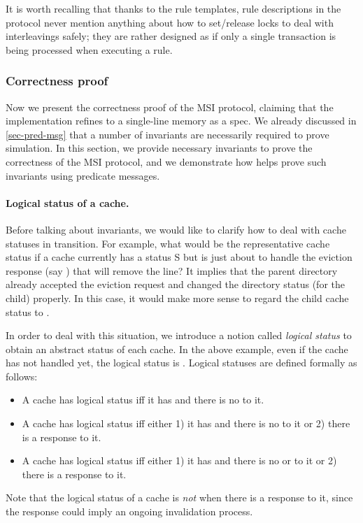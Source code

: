 \documentclass[sigplan,10pt,review,anonymous,screen]{acmart}\settopmatter{printfolios=true,printccs=false,printacmref=false}
\begin{document}
It is worth recalling that thanks to the rule templates, rule descriptions in the protocol never mention anything about how to set/release locks to deal with interleavings safely; they are rather designed as if only a single transaction is being processed when executing a rule.

\subsubsection{Correctness proof}
\label{sec-msi-proof}

Now we present the correctness proof of the MSI protocol, claiming that the implementation refines to a single-line memory as a spec.
We already discussed in \autoref{sec-pred-msg} that a number of invariants are necessarily required to prove simulation.
In this section, we provide necessary invariants to prove the correctness of the MSI protocol, and we demonstrate how \hemiola{} helps prove such invariants using predicate messages.

\paragraph{Logical status of a cache.}
Before talking about invariants, we would like to clarify how to deal with cache statuses in transition.
For example, what would be the representative cache status if a cache currently has a status S but is just about to handle the eviction response (say ) that will remove the line?
It implies that the parent directory already accepted the eviction request and changed the directory status (for the child) properly.
In this case, it would make more sense to regard the child cache status to \stI{}.

In order to deal with this situation, we introduce a notion called \emph{logical status} to obtain an abstract status of each cache.
In the above example, even if the cache has not handled  yet, the logical status is \stI{}.
Logical statuses are defined formally as follows:
\begin{itemize}[leftmargin=*]
\item A cache has logical status \stM{} iff it has \stM{} and there is no  to it.
\item A cache has logical status \stS{} iff either 1) it has \stS{} and there is no  to it or 2) there is a response  to it.
\item A cache has logical status \stI{} iff either 1) it has \stI{} and there is no  or  to it or 2) there is a response  to it.
\end{itemize}
Note that the logical status of a cache is \emph{not} \stM{} when there is a response  to it, since the response could imply an ongoing invalidation process.
\end{document}
